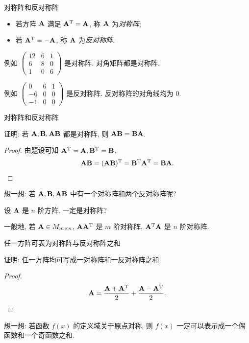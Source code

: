 \begin{frame}{对称阵和反对称阵}
	\onslide<+->
	\begin{definition}
		\begin{itemize}
			\item 若方阵 ${\mathbf{A}}$ 满足 ${\mathbf{A}}^{\mathrm{T}}={\mathbf{A}}$, 称 ${\mathbf{A}}$ 为\emph{对称阵};
			\item 若 ${\mathbf{A}}^{\mathrm{T}}=-{\mathbf{A}}$, 称 ${\mathbf{A}}$ 为\emph{反对称阵}.
		\end{itemize}
	\end{definition}
	\onslide<+->
	例如 $\begin{pmatrix}
		12&6&1\\
		6&8&0\\
		1&0&6
	\end{pmatrix}$
	是对称阵.
	\onslide<+->
	对角矩阵都是对称阵.

	\onslide<+->
	例如 $\begin{pmatrix}
		0&6&1\\
		-6&0&0\\
		-1&0&0
	\end{pmatrix}$
	是反对称阵.
	\onslide<+->
	反对称阵的对角线均为 $0$.
\end{frame}


\begin{frame}{对称阵和反对称阵}
	\onslide<+->
	\begin{example}
		证明: 若 ${\mathbf{A}},{\mathbf{B}},{\mathbf{A}}{\mathbf{B}}$ 都是对称阵, 则 ${\mathbf{A}}{\mathbf{B}}={\mathbf{B}}{\mathbf{A}}$.
	\end{example}
	\onslide<+->
	\begin{proof}
		由题设可知 ${\mathbf{A}}^{\mathrm{T}}={\mathbf{A}},{\mathbf{B}}^{\mathrm{T}}={\mathbf{B}}$,
		\[{\mathbf{A}}{\mathbf{B}}=({\mathbf{A}}{\mathbf{B}})^{\mathrm{T}}={\mathbf{B}}^{\mathrm{T}}{\mathbf{A}}^{\mathrm{T}}={\mathbf{B}}{\mathbf{A}}.\qedhere\]
	\end{proof}
	\onslide<+->
	想一想: 若 ${\mathbf{A}},{\mathbf{B}},{\mathbf{A}}{\mathbf{B}}$ 中有一个对称阵和两个反对称阵呢?
	\onslide<+->
	\begin{exercise}
		设 ${\mathbf{A}}$ 是 $n$ 阶方阵, 一定是对称阵?
	\end{exercise}
	\onslide<+->
	一般地, 若 ${\mathbf{A}}\in M_{m\times n}$, ${\mathbf{A}}{\mathbf{A}}^{\mathrm{T}}$ 是 $m$ 阶对称阵, ${\mathbf{A}}^{\mathrm{T}}{\mathbf{A}}$ 是 $n$ 阶对称阵.
\end{frame}


\begin{frame}{任一方阵可表为对称阵与反对称阵之和}
	\onslide<+->
	\begin{example}
		证明: 任一方阵均可写成一对称阵和一反对称阵之和.
	\end{example}
	\onslide<+->
	\begin{proof}
		\[{\mathbf{A}}=\frac{{\mathbf{A}}+{\mathbf{A}}^{\mathrm{T}}}2+\frac{{\mathbf{A}}-{\mathbf{A}}^{\mathrm{T}}}2.\qedhere\]
	\end{proof}
	\onslide<+->
	想一想: 若函数 $f(x)$ 的定义域关于原点对称, 则 $f(x)$ 一定可以表示成一个偶函数和一个奇函数之和.
\end{frame}

